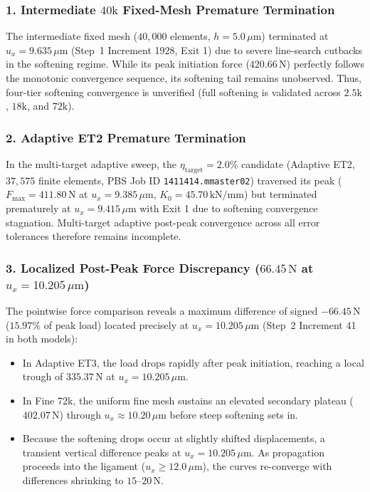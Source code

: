 \subsubsection{1. Intermediate $40\mathrm{k}$ Fixed-Mesh Premature Termination}
The intermediate fixed mesh ($40{,}000$ elements, $h = 5.0\,\mu\mathrm{m}$) terminated at $u_x = 9.635\,\mu\mathrm{m}$ (Step~1 Increment 1928, Exit 1) due to severe line-search cutbacks in the softening regime. While its peak initiation force ($420.66\,\mathrm{N}$) perfectly follows the monotonic convergence sequence, its softening tail remains unobserved. Thus, four-tier softening convergence is unverified (full softening is validated across $2.5\mathrm{k}$, $18\mathrm{k}$, and $72\mathrm{k}$).

\subsubsection{2. Adaptive ET2 Premature Termination}
In the multi-target adaptive sweep, the $\eta_{\mathrm{target}} = 2.0\%$ candidate (Adaptive ET2, $37{,}575$ finite elements, PBS Job ID \texttt{1411414.mmaster02}) traversed its peak ($F_{\max} = 411.80\,\mathrm{N}$ at $u_x = 9.385\,\mu\mathrm{m}$, $K_0 = 45.70\,\mathrm{kN/mm}$) but terminated prematurely at $u_x = 9.415\,\mu\mathrm{m}$ with Exit 1 due to softening convergence stagnation. Multi-target adaptive post-peak convergence across all error tolerances therefore remains incomplete.

\subsubsection{3. Localized Post-Peak Force Discrepancy ($66.45\,\mathrm{N}$ at $u_x = 10.205\,\mu\mathrm{m}$)}
The pointwise force comparison reveals a maximum difference of signed $-66.45\,\mathrm{N}$ ($15.97\%$ of peak load) located precisely at $u_x = 10.205\,\mu\mathrm{m}$ (Step~2 Increment 41 in both models):
\begin{itemize}
  \item In Adaptive ET3, the load drops rapidly after peak initiation, reaching a local trough of $335.37\,\mathrm{N}$ at $u_x = 10.205\,\mu\mathrm{m}$.
  \item In Fine 72k, the uniform fine mesh sustains an elevated secondary plateau ($402.07\,\mathrm{N}$) through $u_x \approx 10.20\,\mu\mathrm{m}$ before steep softening sets in.
  \item Because the softening drops occur at slightly shifted displacements, a transient vertical difference peaks at $u_x = 10.205\,\mu\mathrm{m}$. As propagation proceeds into the ligament ($u_x \ge 12.0\,\mu\mathrm{m}$), the curves re-converge with differences shrinking to $15\text{--}20\,\mathrm{N}$.
\end{itemize}
